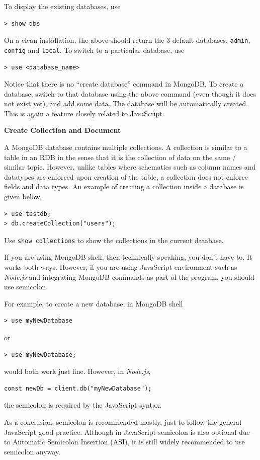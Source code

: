 To display the existing databases, use
\begin{lstlisting}
> show dbs
\end{lstlisting}
On a clean installation, the above should return the 3 default databases, \verb|admin|, \verb|config| and \verb|local|. To switch to a particular database, use
\begin{lstlisting}
> use <database_name>
\end{lstlisting}
Notice that there is no ``create database'' command in MongoDB. To create a database, switch to that database using the above command (even though it does not exist yet), and add some data. The database will be automatically created. This is again a feature closely related to JavaScript.

\vspace{0.1in}
\noindent \textbf{Create Collection and Document}
\vspace{0.1in}

A MongoDB database contains multiple collections. A collection is similar to a table in an RDB in the sense that it is the collection of data on the same / similar topic. However, unlike tables where schematics such as column names and datatypes are enforced upon creation of the table, a collection does not enforce fields and data types. An example of creating a collection inside a database is given below.
\begin{lstlisting}
> use testdb;
> db.createCollection("users");
\end{lstlisting}
Use \verb|show collections| to show the collections in the current database.

\begin{shortbox}

If you are using MongoDB shell, then technically speaking, you don't have to. It works both ways. However, if you are using JavaScript environment such as \textit{Node.js} and integrating MongoDB commands as part of the program, you should use semicolon.

For example, to create a new database, in MongoDB shell
\begin{lstlisting}
> use myNewDatabase
\end{lstlisting}
or
\begin{lstlisting}
> use myNewDatabase;
\end{lstlisting}
would both work just fine. However, in \textit{Node.js},
\begin{lstlisting}
const newDb = client.db("myNewDatabase");
\end{lstlisting}
the semicolon is required by the JavaScript syntax.

As a conclusion, semicolon is recommended mostly, just to follow the general JavaScript good practice. Although in JavaScript semicolon is also optional due to Automatic Semicolon Insertion (ASI), it is still widely recommended to use semicolon anyway.
\end{shortbox}

